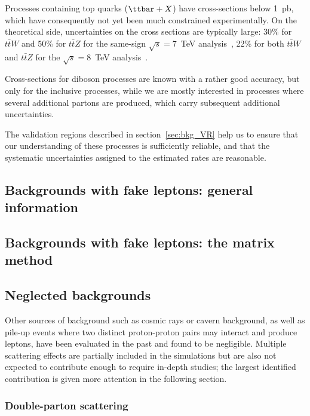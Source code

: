 Processes containing top quarks ($\ttbar + X$) have cross-sections below 1~pb, which have consequently not yet been much constrained experimentally. On the theoretical side, uncertainties on the cross sections are typically large: 30\% for $t\bar{t}W$ and 50\% for $t\bar{t}Z$ for the same-sign $\sqrt{s}=7$~TeV analysis~\cite{NoteSS3L_7TeV}, 22\% for both $t\bar{t}W$ and $t\bar{t}Z$ for the $\sqrt{s}=8$~TeV analysis~\cite{noteSS3L}. 

Cross-sections for diboson processes are known with a rather good accuracy, but only for the inclusive processes, 
while we are mostly interested in processes where several additional partons are produced, 
which carry subsequent additional uncertainties. 

The validation regions described in section~\ref{sec:bkg_VR} help us to ensure that our understanding of these processes is sufficiently reliable, and that the systematic uncertainties assigned to the estimated rates are reasonable. 



\subsection{Backgrounds with fake leptons: general information}
\label{sec:bkg_fakes} 


\subsection{Backgrounds with fake leptons: the matrix method}
\label{sec:bkg_matrix_method}


\subsection{Neglected backgrounds}
\label{sec:bkg_neglected}
Other sources of background such as cosmic rays or cavern background, as well as pile-up events where two distinct proton-proton pairs may interact and produce leptons, 
have been evaluated in the past and found to be negligible. 
Multiple scattering effects are partially included in the simulations but are also not expected to contribute enough to require in-depth studies; 
the largest identified contribution is given more attention in the following section. 

\subsubsection{Double-parton scattering}

